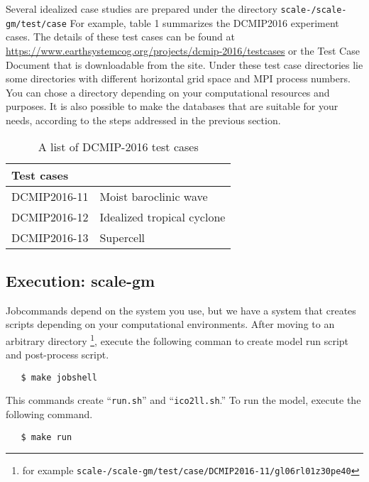 Several idealized case studies are prepared under the directory 
\noindent \texttt{scale-{\version}/scale-gm/test/case} 
For example, table 1 summarizes the DCMIP2016 experiment cases.
The details of these test cases can be found at 
\url{https://www.earthsystemcog.org/projects/dcmip-2016/testcases}
or the Test Case Document that is downloadable from the site.
Under these test case directories lie some directories with 
different horizontal grid space and MPI process numbers. 
You can chose a directory depending on your computational resources 
and purposes.
It is also possible to make the databases that are suitable for your needs,
according to the steps addressed in the previous section.
 \begin{table}[h]
 \begin{center}
 \caption{A list of DCMIP-2016 test cases}
 \begin{tabularx}{150mm}{|l|X|} \hline
 \rowcolor[gray]{0.9} Test cases \\ \hline
  DCMIP2016-11 & Moist baroclinic wave  \\ \hline
  DCMIP2016-12 & Idealized tropical cyclone \\ \hline
  DCMIP2016-13 & Supercell \\ \hline
 \end{tabularx}
 \end{center}
 \end{table}


\subsection{Execution: scale-gm}

Jobcommands depend on the system you use, but we have a system 
that creates scripts depending on your computational environments.
After moving to an arbitrary directory \footnote{for example
  \texttt{scale-{\version}/scale-gm/test/case/DCMIP2016-11/gl06rl01z30pe40}},
execute the following comman to create model run script and post-process script.

 \begin{verbatim}
   $ make jobshell
 \end{verbatim}

This commands create ``\verb|run.sh|'' and ``\verb|ico2ll.sh|.''
To run the model, execute the following command.

 \begin{verbatim}
   $ make run
 \end{verbatim}

